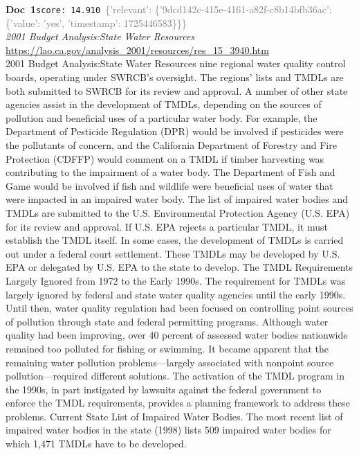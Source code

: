 \documentclass[a4paper,11pt]{article}
\begin{document}
\begin{docenv}
{\footnotesize\textcolor{doccolor}{\textbf{Doc~1}}}\hfill{\tiny\texttt{score:~14.910}}\ {\tiny\textcolor{gray}{\{'relevant': \{'9dcd142c-415e-4161-a82f-c8b14bfb36ac': \{'value': 'yes', 'timestamp': 1725446583\}\}\}}}\\[3pt]
{\small\textit{2001 Budget Analysis:State Water Resources }}\\[2pt]
{\tiny\url{https://lao.ca.gov/analysis\_2001/resources/res\_15\_3940.htm}}\\[4pt]
{\footnotesize 2001 Budget Analysis:State Water Resources 
nine regional water quality control boards, operating under SWRCB's oversight. The regions' lists and TMDLs are both submitted to SWRCB for its review and
approval.
A number of other state agencies assist in the development of TMDLs, depending on the sources of pollution and beneficial uses of a particular water body. For
example, the Department of Pesticide Regulation (DPR) would be involved if pesticides were the pollutants of concern, and the California Department of
Forestry and Fire Protection (CDFFP) would comment on a TMDL if timber harvesting was contributing to the impairment of a water body. The Department of
Fish and Game would be involved if fish and wildlife were beneficial uses of water that were impacted in an impaired water body.
The list of impaired water bodies and TMDLs are submitted to the U.S. Environmental Protection Agency (U.S. EPA) for its review and approval. If U.S. EPA
rejects a particular TMDL, it must establish the TMDL itself. In some cases, the development of TMDLs is carried out under a federal court settlement. These
TMDLs may be developed by U.S. EPA or delegated by U.S. EPA to the state to develop.
The TMDL Requirements Largely Ignored from 1972 to the Early 1990s. The requirement for TMDLs was largely ignored by federal and state water quality
agencies until the early 1990s. Until then, water quality regulation had been focused on controlling point sources of pollution through state and federal
permitting programs. Although water quality had been improving, over 40 percent of assessed water bodies nationwide remained too polluted for fishing or
swimming. It became apparent that the remaining water pollution problems—largely associated with nonpoint source pollution—required different solutions. The
activation of the TMDL program in the 1990s, in part instigated by lawsuits against the federal government to enforce the TMDL requirements, provides a
planning framework to address these problems.
Current State List of Impaired Water Bodies. The most recent list of impaired water bodies in the state (1998) lists 509 impaired water bodies for which 1,471
TMDLs have to be developed.}
\end{docenv}
\end{document}
